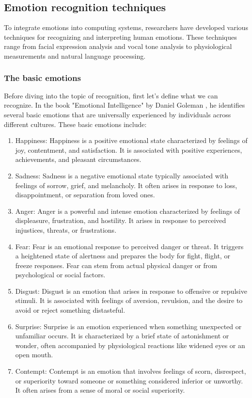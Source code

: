 \subsection{Emotion recognition techniques}
To integrate emotions into computing systems, researchers have developed various techniques for recognizing and interpreting human emotions. 
These techniques range from facial expression analysis and vocal tone analysis to physiological measurements and natural language processing.

\subsubsection{The basic emotions}
Before diving into the topic of recognition, first let's define what we can recognize. In the book "Emotional Intelligence" by Daniel Goleman \cite*{goleman},
he identifies several basic emotions that are universally experienced by individuals across different cultures.
These basic emotions include:

\begin{enumerate}
    \item Happiness: Happiness is a positive emotional state characterized by feelings of joy, contentment, and satisfaction.
    It is associated with positive experiences, achievements, and pleasant circumstances.
    \item Sadness: Sadness is a negative emotional state typically associated with feelings of sorrow, grief, and melancholy. 
    It often arises in response to loss, disappointment, or separation from loved ones.
    \item Anger: Anger is a powerful and intense emotion characterized by feelings of displeasure, frustration, and hostility.
    It arises in response to perceived injustices, threats, or frustrations.
    \item Fear: Fear is an emotional response to perceived danger or threat. It triggers a heightened state of alertness and prepares the body for fight, flight, or freeze responses. 
    Fear can stem from actual physical danger or from psychological or social factors.
    \item Disgust: Disgust is an emotion that arises in response to offensive or repulsive stimuli. 
    It is associated with feelings of aversion, revulsion, and the desire to avoid or reject something distasteful.
    \item Surprise: Surprise is an emotion experienced when something unexpected or unfamiliar occurs. 
    It is characterized by a brief state of astonishment or wonder, often accompanied by physiological reactions like widened eyes or an open mouth.
    \item Contempt: Contempt is an emotion that involves feelings of scorn, disrespect, or superiority toward someone or something considered inferior or unworthy.
    It often arises from a sense of moral or social superiority.
\end{enumerate}

